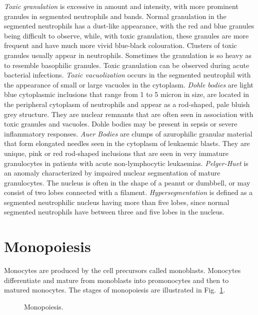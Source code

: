 \documentclass[final,a4paper,12pt,english]{UnicaPhdThesis3}
\begin{document}
\textit{Toxic granulation} is excessive in amount and intensity, with more prominent granules in segmented neutrophils and bands. Normal granulation in the segmented neutrophils has a dust-like appearance, with the red and blue granules being difficult to observe, while, with toxic granulation, these granules are more frequent and have much more vivid blue-black colouration. Clusters of toxic granules usually appear in neutrophils. Sometimes the granulation is so heavy as to resemble basophilic granules. Toxic granulation can be observed during acute bacterial infections. \textit{Toxic vacuolization} occurs in the segmented neutrophil with the appearance of small or large vacuoles in the cytoplasm. \textit{Dohle bodies} are light blue cytoplasmic inclusions that range from 1 to 5 micron in size, are located in the peripheral cytoplasm of neutrophils and appear as a rod-shaped, pale bluish grey structure. They are nuclear remnants that are often seen in association with toxic granules and vacuoles. Dohle bodies may be present in sepsis or severe inflammatory responses. \textit{Auer Bodies} are clumps of azurophilic granular material that form elongated needles seen in the cytoplasm of leukaemic blasts. They are unique, pink or red rod-shaped inclusions that are seen in very immature granulocytes in patients with acute non-lymphocytic leukaemias. \textit{Pelger-Huet} is an anomaly characterized by impaired nuclear segmentation of mature granulocytes. The nucleus is often in the shape of a peanut or dumbbell, or may consist of two lobes connected with a filament. \textit{Hypersegmentation} is defined as a segmented neutrophilic nucleus having more than five lobes, since normal segmented neutrophils have between three and five lobes in the nucleus. 

\section{Monopoiesis}
Monocytes are produced by the cell precursors called monoblasts. Monocytes differentiate and mature from monoblasts into promonocytes and then to matured monocytes. The stages of monopoiesis are illustrated in Fig.~\ref{fig:Monopoiesis}.

\begin{figure}[!htbp]
\centering
\caption{\label{fig:Monopoiesis} Monopoiesis.}
\end{figure}
\end{document}
